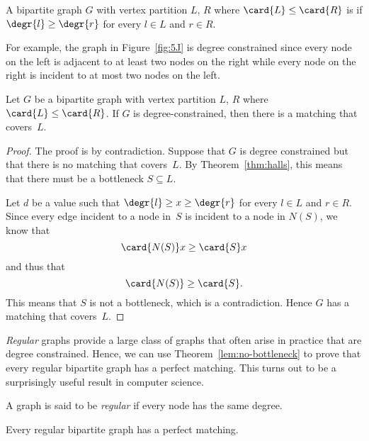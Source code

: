 \begin{definition}\label{degree-constrained_def}
A bipartite graph $G$ with vertex partition $L$, $R$ where $\card{L}
\le \card{R}$ is  if $\degr{l} \geq \degr{r}$
for every $l \in L$ and $r \in R$.
\end{definition}

For example, the graph in Figure~\ref{fig:5J} is degree constrained
since every node on the left is adjacent to at least two nodes on the
right while every node on the right is incident to at most two nodes
on the left.

\begin{theorem}\label{lem:no-bottleneck}
Let $G$ be a bipartite graph with vertex partition $L$, $R$ where
$\card{L} \le \card{R}$.  If $G$ is degree-constrained, then there is
a matching that covers~$L$.
\end{theorem}

\begin{proof}
The proof is by contradiction.  Suppose that $G$ is degree constrained
but that there is no matching that covers~$L$.  By
Theorem~\ref{thm:halls}, this means that there must be a bottleneck $S
\subseteq L$.

Let $d$ be a value such that $\degr{l} \ge x \ge \degr{r}$ for every
$l \in L$ and $r \in R$.  Since every edge incident to a node in~$S$
is incident to a node in $N(S)$, we know that
\begin{equation*}
    \card{N(S)} x \ge \card{S} x
\end{equation*}
and thus that
\begin{equation*}
    \card{N(S)} \ge \card{S}.
\end{equation*}
This means that $S$ is not a bottleneck, which is a contradiction.
Hence $G$ has a matching that covers~$L$.
\end{proof}

\emph{Regular} graphs provide a large class of graphs that often arise
in practice that are degree constrained.  Hence, we can use
Theorem~\ref{lem:no-bottleneck} to prove that every regular bipartite
graph has a perfect matching.  This turns out to be a surprisingly
useful result in computer science.

\begin{definition}\label{def:5P}
A graph is said to be \emph{regular} if every node has the same degree.
\end{definition}

\begin{theorem}\label{thm:5M}
Every regular bipartite graph has a perfect matching.
\end{theorem}


